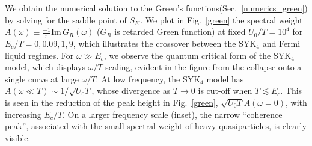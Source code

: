 \documentclass[twocolumn,floatfix,superscriptaddress]{revtex4-1}
\begin{document}
 We obtain the numerical solution to the Green's functions(Sec.~\ref{numerics_green}) by solving for the saddle point of $S_K$.   We plot in Fig.~\ref{green} the spectral weight $A(\omega)\equiv \frac{-1}{\pi}\text{Im}\,G_R(\omega)$ ($G_R$ is retarded Green function) at fixed $U_0 /T =10^4$ for $E_c/T=0,0.09,1,9$, which illustrates the crossover between the SYK$_4$ and Fermi liquid regimes.  For $\omega \gg E_c$, we observe the quantum critical form of the SYK$_4$ model, which displays $\omega/T$ scaling,  evident in the figure from the collapse onto a single curve at large $\omega/T$.  At low frequency, the SYK$_4$ model has $A(\omega \ll T) \sim 1/\sqrt{U_0 T}$, whose divergence as $T\rightarrow 0$ is cut-off when $T \lesssim E_c$.   This is seen in the reduction of the peak height in Fig.~\ref{green}, $\sqrt{U_0 T}A(\omega=0)$, with increasing $E_c/T$.  On a larger frequency scale (inset), the narrow ``coherence peak'', associated with the small spectral weight of heavy quasiparticles, is clearly visible.

\end{document}
